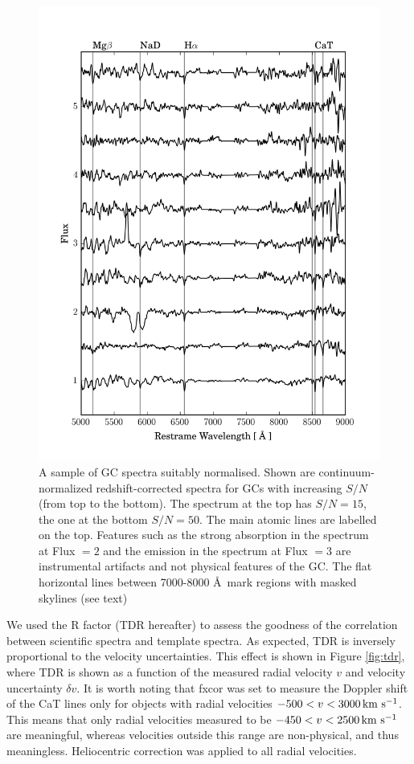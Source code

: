 \begin{figure}
\centering
\includegraphics[width=\columnwidth]{figures/vstack_spectra.png} 
\caption{A sample of GC spectra suitably normalised. Shown are 
continuum-normalized redshift-corrected spectra for GCs with increasing $S/N$ 
(from top to the bottom). The spectrum at the top has $S/N = 15$, the one at 
the bottom $S/N = 50$. The main atomic lines are labelled on the top. Features 
such as the strong absorption in the spectrum at Flux $= 2$ and the emission in 
the spectrum at Flux $=3$ are instrumental artifacts and not physical features 
of the GC. The flat horizontal lines between 7000-8000 \AA\ mark regions with 
masked skylines (see text)}
\label{fig:spectra}
\end{figure}

We used the \citet{Tonry79} R factor (TDR hereafter) to assess the goodness of 
the correlation between scientific spectra and template spectra. As expected, 
TDR is inversely proportional to the velocity uncertainties. This effect is 
shown in Figure \ref{fig:tdr}, where TDR is shown as a function of the measured 
radial velocity $v$ and velocity uncertainty $\delta v$. 
It is worth noting that fxcor was set to measure the Doppler shift of the CaT 
lines only for objects with radial velocities $-500 < v < 3000 \mbox{\,km~s$^{-1}$}$. This 
means that only radial velocities measured to be $-450 < v < 2500 \mbox{\,km~s$^{-1}$}$ are 
meaningful, whereas velocities outside this range are non-physical, and thus 
meaningless. Heliocentric correction was applied to all radial velocities. 

